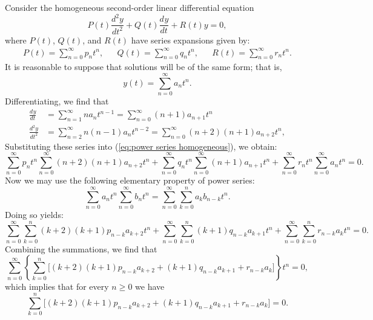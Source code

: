 \documentclass{myart}
\newcommand{\eq}[1]{(\ref{eq:#1})}
\newcommand{\deriv}[3][]{\frac{d^{#1}#2}{d#3^{#1}}}
\begin{document}
Consider the homogeneous second-order linear differential equation
\begin{equation} \label{eq:power series homogeneous}
  P(t) \deriv[2]{y}{t} + Q(t) \deriv{y}{t} + R(t) y = 0,
\end{equation}
where $P(t)$, $Q(t)$, and $R(t)$ have series expansions given by:
\begin{align*}
     P(t) = \sum_{n=0}^\infty p_n t^n,
  && Q(t) = \sum_{n=0}^\infty q_n t^n,
  && R(t) = \sum_{n=0}^\infty r_n t^n.
\end{align*}
It is reasonable to suppose that solutions will be of the same form;
that is,
\begin{equation*}
  y(t) = \sum_{n=0}^\infty a_n t^n.
\end{equation*}
Differentiating, we find that
\begin{align*}
  \deriv{y}{t} &= \sum_{n=1}^\infty  n    a_ n    t^{n-1}
                = \sum_{n=0}^\infty (n+1) a_{n+1} t^ n \\
  \deriv[2]{y}{t} &= \sum_{n=2}^\infty  n   (n-1) a_ n    t^{n-2}
                   = \sum_{n=0}^\infty (n+2)(n+1) a_{n+2} t^ n,
\end{align*}
Substituting these series into \eq{power series homogeneous}, we
obtain:
\begin{equation*}
    \sum_{n=0}^\infty p_n t^n \sum_{n=0}^\infty (n+2)(n+1) a_{n+2} t^n
  + \sum_{n=0}^\infty q_n t^n \sum_{n=0}^\infty (n+1)      a_{n+1} t^n
  + \sum_{n=0}^\infty r_n t^n \sum_{n=0}^\infty            a_ n    t^n
  = 0.
\end{equation*}
Now we may use the following elementary property of power series:
\begin{equation*}
    \sum_{n=0}^\infty a_n t^n \sum_{n=0}^\infty b_n t^n
  = \sum_{n=0}^\infty \sum_{k=0}^n a_k b_{n-k} t^n.
\end{equation*}
Doing so yields:
\begin{equation*}
    \sum_{n=0}^\infty \sum_{k=0}^n (k+2)(k+1) p_{n-k} a_{k+2} t^n
  + \sum_{n=0}^\infty \sum_{k=0}^n (k+1) q_{n-k} a_{k+1} t^n
  + \sum_{n=0}^\infty \sum_{k=0}^n r_{n-k} a_k t^n
  = 0.
\end{equation*}
Combining the summations, we find that
\begin{equation*}
  \sum_{n=0}^\infty \left\{\sum_{k=0}^n \bigg[
    (k+2)(k+1) p_{n-k} a_{k+2} + (k+1) q_{n-k} a_{k+1} + r_{n-k} a_k
  \bigg]\right\} t^n = 0,
\end{equation*}
which implies that for every $n \geq 0$ we have
\begin{equation}
  \sum_{k=0}^n \bigg[
    (k+2)(k+1) p_{n-k} a_{k+2} + (k+1) q_{n-k} a_{k+1} + r_{n-k} a_k
  \bigg] = 0.
\end{equation}
\end{document}
